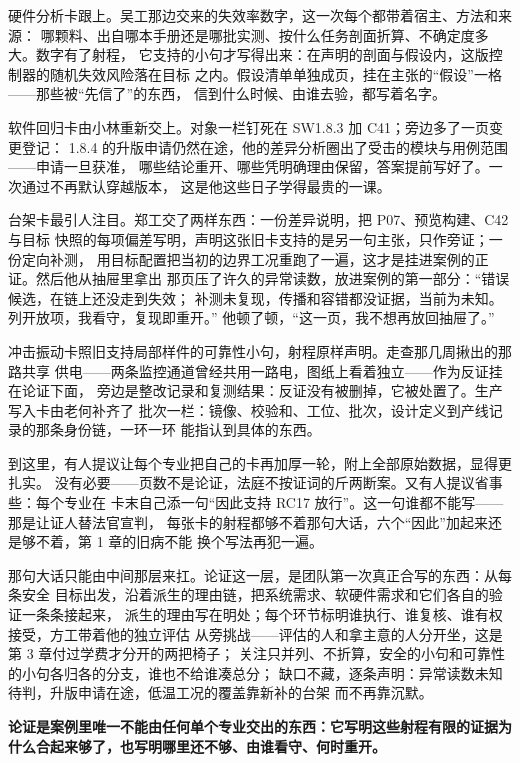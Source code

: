 硬件分析卡跟上。吴工那边交来的失效率数字，这一次每个都带着宿主、方法和来源：
哪颗料、出自哪本手册还是哪批实测、按什么任务剖面折算、不确定度多大。数字有了射程，
它支持的小句才写得出来：在声明的剖面与假设内，这版控制器的随机失效风险落在目标
之内。假设清单单独成页，挂在主张的“假设”一格——那些被“先信了”的东西，
信到什么时候、由谁去验，都写着名字。

软件回归卡由小林重新交上。对象一栏钉死在 SW1.8.3 加 C41；旁边多了一页变更登记：
1.8.4 的升版申请仍然在途，他的差异分析圈出了受击的模块与用例范围——申请一旦获准，
哪些结论重开、哪些凭明确理由保留，答案提前写好了。一次通过不再默认穿越版本，
这是他这些日子学得最贵的一课。

台架卡最引人注目。郑工交了两样东西：一份差异说明，把 P07、预览构建、C42 与目标
快照的每项偏差写明，声明这张旧卡支持的是另一句主张，只作旁证；一份定向补测，
用目标配置把当初的边界工况重跑了一遍，这才是挂进案例的正证。然后他从抽屉里拿出
那页压了许久的异常读数，放进案例的第一部分：“错误候选，在链上还没走到失效；
补测未复现，传播和容错都没证据，当前为未知。列开放项，我看守，复现即重开。”
他顿了顿，“这一页，我不想再放回抽屉了。”

冲击振动卡照旧支持局部样件的可靠性小句，射程原样声明。走查那几周揪出的那路共享
供电——两条监控通道曾经共用一路电，图纸上看着独立——作为反证挂在论证下面，
旁边是整改记录和复测结果：反证没有被删掉，它被处置了。生产写入卡由老何补齐了
批次一栏：镜像、校验和、工位、批次，设计定义到产线记录的那条身份链，一环一环
能指认到具体的东西。

到这里，有人提议让每个专业把自己的卡再加厚一轮，附上全部原始数据，显得更扎实。
没有必要——页数不是论证，法庭不按证词的斤两断案。又有人提议省事些：每个专业在
卡末自己添一句“因此支持 RC17 放行”。这一句谁都不能写——那是让证人替法官宣判，
每张卡的射程都够不着那句大话，六个“因此”加起来还是够不着，第 1 章的旧病不能
换个写法再犯一遍。

那句大话只能由中间那层来扛。论证这一层，是团队第一次真正合写的东西：从每条安全
目标出发，沿着派生的理由链，把系统需求、软硬件需求和它们各自的验证一条条接起来，
派生的理由写在明处；每个环节标明谁执行、谁复核、谁有权接受，方工带着他的独立评估
从旁挑战——评估的人和拿主意的人分开坐，这是第 3 章付过学费才分开的两把椅子；
关注只并列、不折算，安全的小句和可靠性的小句各归各的分支，谁也不给谁凑总分；
缺口不藏，逐条声明：异常读数未知待判，升版申请在途，低温工况的覆盖靠新补的台架
而不再靠沉默。

\textbf{论证是案例里唯一不能由任何单个专业交出的东西：它写明这些射程有限的证据为什么合起来够了，也写明哪里还不够、由谁看守、何时重开。}

